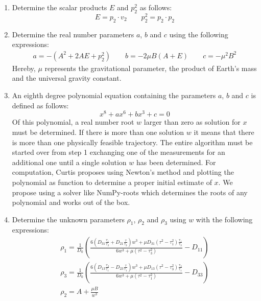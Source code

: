 \documentclass[11pt,a4paper]{article}
\begin{document}
\begin{enumerate}
		\item Determine the scalar products $E$ and $p_2^2$ as follows:
		\begin{equation}
			E=p_2 \cdot v_2 \qquad p_2^2=p_2\cdot p_2
		\end{equation}
		
		\item Determine the real number parameters $a$, $b$ and $c$ using the following expressions:
		\begin{equation}
			\begin{aligned}
				a = -\left(A^2 + 2AE + p_2^2\right) \qquad b = -2\mu B(A + E) \qquad c = -\mu^2 B^2
			\end{aligned}
		\end{equation}
		\noindent
		Hereby, $\mu$ represents the gravitational parameter, the product of Earth's mass and the universal gravity constant.
		
		\item An eighth degree polynomial equation containing the parameters $a$, $b$ and $c$ is defined as follows:
		\begin{equation}
			x^8+ax^6+bx^3+c=0
		\end{equation}
		\noindent
		Of this polynomial, a real number root $w$ larger than zero as solution for $x$  must be determined. If there is more than one solution $w$ it means that there is more than one physically feasible trajectory. The entire algorithm must be started over from step 1 exchanging one of the measurements for an additional one until a single solution $w$ has been determined. For computation, Curtis proposes using Newton's method and plotting the polynomial as function to determine a proper initial estimate of $x$. We propose using a solver like NumPy-roots which determines the roots of any polynomial \cite{numpy_roots} and works out of the box.
		
		\item Determine the unknown parameters $\rho_1$, $\rho_2$ and $\rho_3$ using $w$ with the following expressions:
		\begin{equation}
			\begin{aligned}
				\rho_1 =
				\frac{1}{D_0}
				\left(
				\frac{
					6\left(
					D_{31}\frac{\tau_1}{\tau_3}
					+
					D_{21}\frac{\tau}{\tau_3}
					\right)w^3
					+
					\mu D_{31}
					\left(\tau^2-\tau_1^2\right)
					\frac{\tau_1}{\tau_3}
				}{
					6w^3+\mu\left(\tau^2-\tau_3^2\right)
				}
				-
				D_{11}
				\right) \\
				\rho_3 =
				\frac{1}{D_0}
				\left(
				\frac{
					6\left(
					D_{13}\frac{\tau_3}{\tau_1}
					-
					D_{23}\frac{\tau}{\tau_1}
					\right)w^3
					+
					\mu D_{13}
					\left(\tau^2-\tau_3^2\right)
					\frac{\tau_3}{\tau_1}
				}{
					6w^3+\mu\left(\tau^2-\tau_1^2\right)
				}
				-
				D_{33}
				\right) \\
				\rho_2 = A + \frac{\mu B}{w^3} 
			\end{aligned}
		\end{equation}
		

\end{enumerate}
\end{document}
